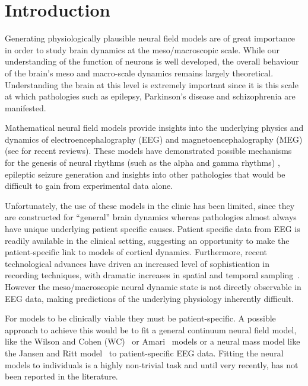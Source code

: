 \documentclass[10pt,a4paper]{article}
\begin{document}
\section{Introduction} 

Generating physiologically plausible neural field models are of great importance in order to study brain dynamics at the meso/macroscopic scale. While our understanding of the function of neurons is well developed, the overall behaviour of the brain's meso and macro-scale dynamics remains largely theoretical. Understanding the brain at this level is extremely important since it is this scale at which pathologies such as epilepsy, Parkinson's disease and schizophrenia are manifested. 

Mathematical neural field models provide insights into the underlying physics and dynamics of electroencephalography (EEG) and magnetoencephalography (MEG) (see \cite{Deco2008,David2003} for recent reviews). These models have demonstrated possible mechanisms for the genesis of neural rhythms (such as the alpha and gamma rhythms) \cite{Liley1999,RENNIE2000}, epileptic seizure generation \cite{DaSilva2003,Suffczynski2004,Wendling2005} and insights into other pathologies \cite{Moran2008,Schiff2009} that would be difficult to gain from experimental data alone. 

Unfortunately, the use of these models in the clinic has been limited, since they are constructed for ``general'' brain dynamics whereas pathologies almost always have unique underlying patient specific causes. Patient specific data from EEG is readily available in the clinical setting, suggesting an opportunity to make the patient-specific link to models of cortical dynamics. Furthermore, recent technological advances have driven an increased level of sophistication in recording techniques, with dramatic increases in spatial and temporal sampling~\cite{Brinkmann2009}. However the meso/macroscopic neural dynamic state is not directly observable in EEG data, making predictions of the underlying physiology inherently difficult.

For models to be clinically viable they must be patient-specific. A possible approach to achieve this would be to fit a general continuum neural field model, like the Wilson and Cohen (WC)~\cite{Wilson1973} or Amari~\cite{Amari1977} models or a neural mass model like the Jansen and Ritt model~\cite{Jansen1995} to patient-specific EEG data. Fitting the neural models to individuals is a highly non-trivial task and until very recently, has not been reported in the literature. 
\end{document}
